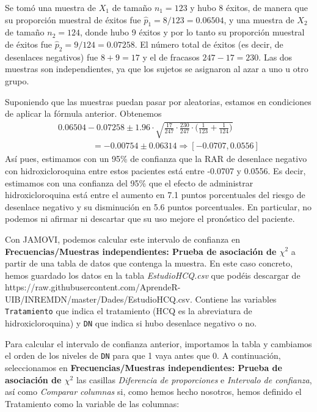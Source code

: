 \documentclass[
  spanish,
  letterpaper,
  DIV=11,
  numbers=noendperiod]{scrreprt}
\begin{document}
Se tomó una muestra de \(X_1\) de tamaño \(n_1=123\) y hubo 8 éxitos, de
manera que su proporción muestral de éxitos fue
\(\widehat{p}_1=8/123=0.06504\), y una muestra de \(X_2\) de tamaño
\(n_2=124\), donde hubo 9 éxitos y por lo tanto su proporción muestral
de éxitos fue \(\widehat{p}_2=9/124=0.07258\). El número total de éxitos
(es decir, de desenlaces negativos) fue \(8+9=17\) y el de fracasos
\(247-17=230\). Las dos muestras son independientes, ya que los sujetos
se asignaron al azar a uno u otro grupo.

Suponiendo que las muestras puedan pasar por aleatorias, estamos en
condiciones de aplicar la fórmula anterior. Obtenemos \[
\begin{array}{l}
\displaystyle 0.06504-0.07258 \pm 1.96\cdot
\sqrt{\frac{17}{247}\cdot \frac{230}{247}\cdot \Big(\frac{1}{123}+\frac{1}{124}
\Big)}\\
\qquad\qquad =-0.00754\pm 0.06314\Rightarrow [-0.0707,  0.0556]
\end{array}
\] Así pues, estimamos con un 95\% de confianza que la RAR de desenlace
negativo con hidroxicloroquina entre estos pacientes está entre -0.0707
y 0.0556. Es decir, estimamos con una confianza del 95\% que el efecto
de administrar hidroxicloroquina está entre el aumento en 7.1 puntos
porcentuales del riesgo de desenlace negativo y su disminución en 5.6
puntos porcentuales. En particular, no podemos ni afirmar ni descartar
que su uso mejore el pronóstico del paciente.

Con JAMOVI, podemos calcular este intervalo de confianza en
\textbf{Frecuencias/Muestras independientes: Prueba de asociación de
\(\chi^2\)} a partir de una tabla de datos que contenga la muestra. En
este caso concreto, hemos guardado los datos en la tabla
\emph{EstudioHCQ.csv} que podéis descargar de
https://raw.githubusercontent.com/AprendeR-UIB/INREMDN/master/Dades/EstudioHCQ.csv.
Contiene las variables \texttt{Tratamiento} que indica el tratamiento
(HCQ es la abreviatura de hidroxicloroquina) y \texttt{DN} que indica si
hubo desenlace negativo o no.

Para calcular el intervalo de confianza anterior, importamos la tabla y
cambiamos el orden de los niveles de \texttt{DN} para que 1 vaya antes
que 0. A continuación, seleccionamos en \textbf{Frecuencias/Muestras
independientes: Prueba de asociación de \(\chi^2\)} las casillas
\emph{Diferencia de proporciones} e \emph{Intervalo de confianza}, así
como \emph{Comparar columnas} si, como hemos hecho nosotros, hemos
definido el Tratamiento como la variable de las columnas:
\end{document}
